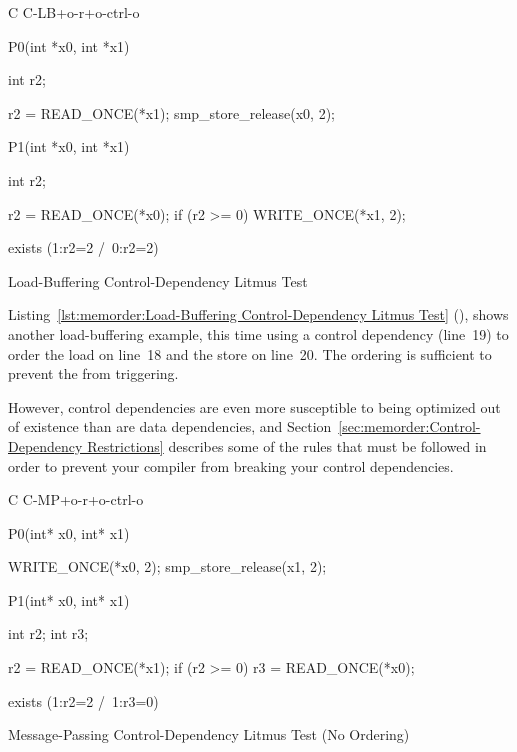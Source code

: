 \begin{listing}[tbp]
{ \scriptsize
\begin{verbbox}[\LstLineNo]
C C-LB+o-r+o-ctrl-o
{
}

P0(int *x0, int *x1)
{
  int r2;

  r2 = READ_ONCE(*x1);
  smp_store_release(x0, 2);
}


P1(int *x0, int *x1)
{
  int r2;

  r2 = READ_ONCE(*x0);
  if (r2 >= 0)
    WRITE_ONCE(*x1, 2);
}

exists (1:r2=2 /\ 0:r2=2)
\end{verbbox}
}
\centering
\theverbbox
\caption{Load-Buffering Control-Dependency Litmus Test}
\label{lst:memorder:Load-Buffering Control-Dependency Litmus Test}
\end{listing}

Listing~\ref{lst:memorder:Load-Buffering Control-Dependency Litmus Test}
(),
shows another load-buffering example, this time using a control
dependency (line~19) to order the load on line~18 and the store on
line~20.
The ordering is sufficient to prevent the  from triggering.

However, control dependencies are even more susceptible to being optimized
out of existence than are data dependencies, and
Section~\ref{sec:memorder:Control-Dependency Restrictions}
describes some of the rules that must be followed in order to prevent
your compiler from breaking your control dependencies.

\begin{listing}[tbp]
{ \scriptsize
\begin{verbbox}[\LstLineNo]
C C-MP+o-r+o-ctrl-o

{
}

P0(int* x0, int* x1) {

  WRITE_ONCE(*x0, 2);
  smp_store_release(x1, 2);

}

P1(int* x0, int* x1) {
  int r2;
  int r3;

  r2 = READ_ONCE(*x1);
  if (r2 >= 0)
    r3 = READ_ONCE(*x0);

}

exists (1:r2=2 /\ 1:r3=0)
\end{verbbox}
}
\centering
\theverbbox
\caption{Message-Passing Control-Dependency Litmus Test (No Ordering)}
\label{lst:memorder:Message-Passing Control-Dependency Litmus Test (No Ordering)}
\end{listing}

